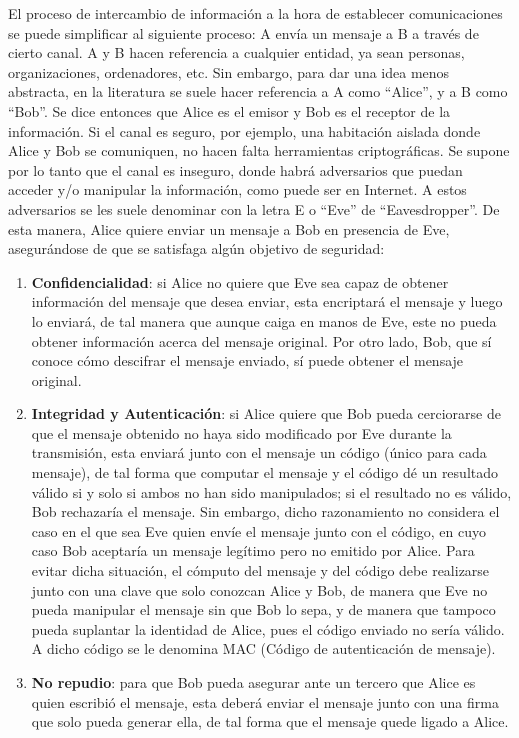 El proceso de intercambio de información  a la hora de establecer comunicaciones se puede simplificar al siguiente proceso: A envía un mensaje a B a través de cierto canal. A y B hacen referencia a cualquier entidad, ya sean personas, organizaciones, ordenadores, etc. Sin embargo, para dar una idea menos abstracta, en la literatura se suele hacer referencia a A como ``Alice'', y a B como ``Bob''. Se dice entonces que Alice es el emisor y Bob es el receptor de la información. Si el canal es seguro, por ejemplo, una habitación aislada donde Alice y Bob se comuniquen, no hacen falta herramientas criptográficas. Se supone por lo tanto que el canal es inseguro, donde habrá adversarios que puedan acceder y/o manipular la información, como puede ser en Internet. A estos adversarios se les suele denominar con la letra E o ``Eve'' de ``Eavesdropper''. De esta manera, Alice quiere enviar un mensaje a Bob en presencia de Eve, asegurándose de que se satisfaga algún objetivo de seguridad:

\begin{enumerate}[label={--}]
    \item \textbf{Confidencialidad}: si Alice no quiere que Eve sea capaz de obtener información del mensaje que desea enviar, esta encriptará el mensaje y luego lo enviará, de tal manera que aunque caiga en manos de Eve, este no pueda obtener información acerca del mensaje original. Por otro lado, Bob, que sí conoce cómo descifrar el mensaje enviado, sí puede obtener el mensaje original.
    \item \textbf{Integridad y Autenticación}: si Alice quiere que Bob pueda cerciorarse de que el mensaje obtenido no haya sido modificado por Eve durante la transmisión, esta enviará junto con el mensaje un código (único para cada mensaje), de tal forma que computar el mensaje y el código dé un resultado válido si y solo si ambos no han sido manipulados; si el resultado no es válido, Bob rechazaría el mensaje. Sin embargo, dicho razonamiento no considera el caso en el que sea Eve quien envíe el mensaje junto con el código, en cuyo caso Bob aceptaría un mensaje legítimo pero no emitido por Alice. Para evitar dicha situación, el cómputo del mensaje y del código debe realizarse junto con una clave que solo conozcan Alice y Bob, de manera que Eve no pueda manipular el mensaje sin que Bob lo sepa, y de manera que tampoco pueda suplantar la identidad de Alice, pues el código enviado no sería válido. A dicho código se le denomina MAC (Código de autenticación de mensaje).
    \item \textbf{No repudio}: para que Bob pueda asegurar ante un tercero que Alice es quien escribió el mensaje, esta deberá enviar el mensaje junto con una firma que solo pueda generar ella, de tal forma que el mensaje quede ligado a Alice.
\end{enumerate}

